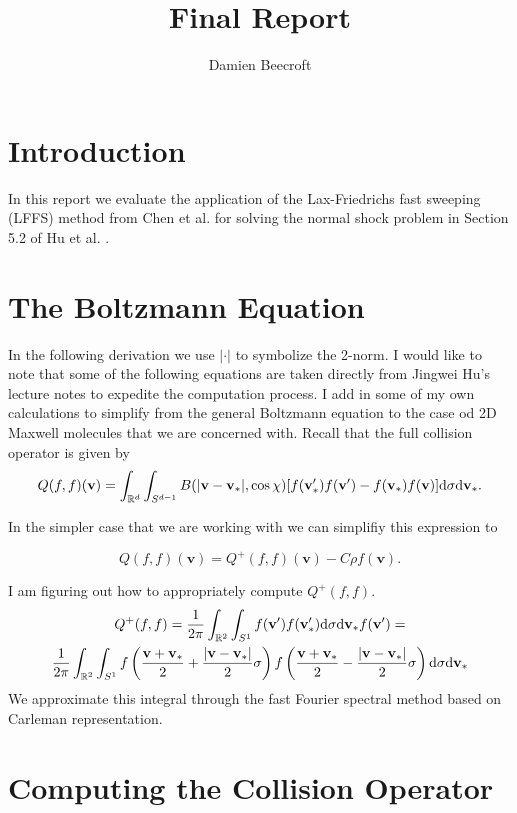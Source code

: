 \documentclass{article}
\title{Final Report}
\author{Damien Beecroft}
\def\b{\mathbf}
\def\t{\text}
\begin{document}
\maketitle
\section{Introduction}
In this report we evaluate the application of the Lax-Friedrichs fast sweeping (LFFS) method from Chen et al. \cite{CHEN2013452} for solving the normal shock problem in Section 5.2 of Hu et al. \cite{hu2021adaptive}.


\section{The Boltzmann Equation}
In the following derivation we use $|\cdot|$ to symbolize the 2-norm. I would like to note that some of the following equations are taken directly from Jingwei Hu's lecture notes to expedite the computation process. I add in some of my own calculations to simplify from the general Boltzmann equation to the case od 2D Maxwell molecules that we are concerned with. Recall that the full collision operator is given by
\begin{equation} \label{eq:collision}
    Q(f,f)(\b v) = \int_{\mathbb{R}^d} \int_{S^{d-1}} B(|\b v - \b v_*|,\cos \chi)[f(\b v_*') f(\b v') - f(\b v_*) f(\b v)] \t d \sigma \t d \b v_*.
\end{equation}

In the simpler case that we are working with we can simplifiy this expression to

\[
    Q(f,f)(\b v) = Q^+(f,f)(\b v) - C \rho f(\b v).
\]

I am figuring out how to appropriately compute $Q^+(f,f)$.
\begin{gather*}
    Q^+(f,f) = \frac{1}{2 \pi} \int_{\mathbb{R}^2} \int_{S^1} f(\b v') f(\b v'_*) \t d \sigma \t d \b v_*f(\b v') = \\
    \frac{1}{2 \pi} \int_{\mathbb{R}^2} \int_{S^1} f \left(\frac{\b v + \b v_*}{2} + \frac{|\b v - \b v_*| }{2} \sigma \right) f \left(\frac{\b v + \b v_*}{2} - \frac{|\b v - \b v_*| }{2} \sigma \right)\t d \sigma \t d \b v_*
\end{gather*}
We approximate this integral through the fast Fourier spectral method based on Carleman representation.

\section{Computing the Collision Operator}
\end{document}

